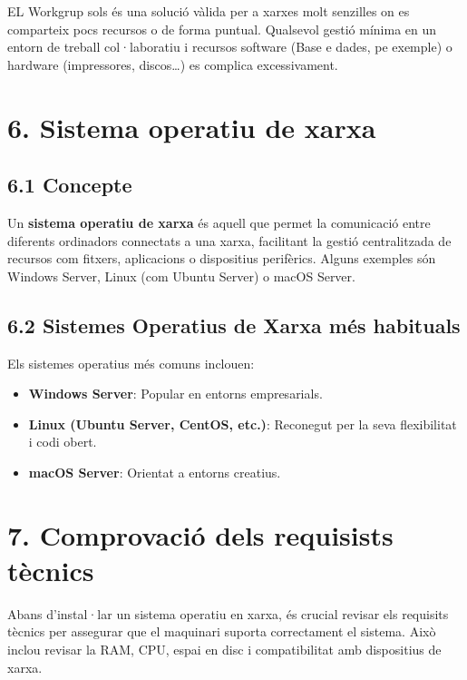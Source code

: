 \documentclass[
  a4paper,
]{article}
\providecommand{\tightlist}{%
  \setlength{\itemsep}{0pt}\setlength{\parskip}{0pt}}
\begin{document}
EL Workgrup sols és una solució vàlida per a xarxes molt senzilles on es
comparteix pocs recursos o de forma puntual. Qualsevol gestió mínima en
un entorn de treball col·laboratiu i recursos software (Base e dades, pe
exemple) o hardware (impressores, discos\ldots) es complica
excessivament.

\section{6. Sistema operatiu de xarxa}\label{sistema-operatiu-de-xarxa}

\subsection{6.1 Concepte}\label{concepte}

Un \textbf{sistema operatiu de xarxa} és aquell que permet la
comunicació entre diferents ordinadors connectats a una xarxa,
facilitant la gestió centralitzada de recursos com fitxers, aplicacions
o dispositius perifèrics. Alguns exemples són Windows Server, Linux (com
Ubuntu Server) o macOS Server.

\subsection{6.2 Sistemes Operatius de Xarxa més
habituals}\label{sistemes-operatius-de-xarxa-muxe9s-habituals}

Els sistemes operatius més comuns inclouen:

\begin{itemize}
\tightlist
\item
  \textbf{Windows Server}: Popular en entorns empresarials.
\item
  \textbf{Linux (Ubuntu Server, CentOS, etc.)}: Reconegut per la seva
  flexibilitat i codi obert.
\item
  \textbf{macOS Server}: Orientat a entorns creatius.
\end{itemize}

\section{7. Comprovació dels requisists
tècnics}\label{comprovaciuxf3-dels-requisists-tuxe8cnics}

Abans d'instal·lar un sistema operatiu en xarxa, és crucial revisar els
requisits tècnics per assegurar que el maquinari suporta correctament el
sistema. Això inclou revisar la RAM, CPU, espai en disc i compatibilitat
amb dispositius de xarxa.
\end{document}
